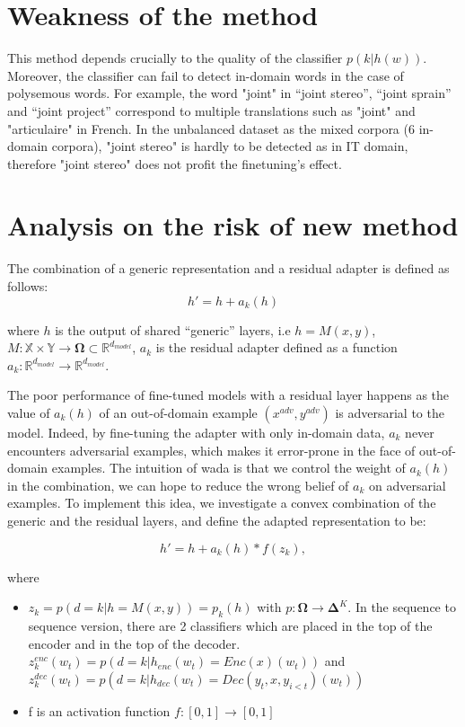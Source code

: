\documentclass[12pt,a4paper,twoside]{report}
\theoremstyle{definition}
\newcommand{\fyTodo}[1]{\Todo[FY:]{\textcolor{orange}{#1}}}
\begin{document}
\section*{Weakness of the method}

This method depends crucially to the quality of the classifier $p(k|h(w))$. Moreover, the classifier can fail to detect in-domain words in the case of polysemous words. For example, the word "joint" in ``joint stereo'', ``joint sprain'' and ``joint project'' correspond to multiple translations such as "joint" and "articulaire" in French. In the unbalanced dataset as the mixed corpora (6 in-domain corpora),  "joint stereo" is hardly to be detected as in IT domain, therefore "joint stereo" does not profit the finetuning's effect.

\section*{Analysis on the risk of new method}

The combination of a generic representation and a residual adapter is defined as follows:
\begin{equation}
  h' = h + a_k(h) \label{eq:residual-adapter}
\end{equation}

where $h$ is the output of shared ``generic'' layers, i.e $h=M(x,y)$, $M: \mathbb{X} \times \mathbb{Y} \rightarrow \mathbf{\Omega}\subset \mathbb{R}^{d_{model}}$, $a_k$ is the residual adapter defined as a function $a_k: \mathbb{R}^{d_{model}} \rightarrow \mathbb{R}^{d_{model}}$.

The poor performance of fine-tuned models with a residual layer happens as the value of $a_k(h)$ of an out-of-domain example $(x^{adv}, y^{adv})$ is adversarial to the model. Indeed, by fine-tuning the adapter with only in-domain data, $a_k$ never encounters adversarial examples, which makes it error-prone in the face of out-of-domain examples. The intuition of wada is that we control the weight of $a_k(h)$ in the combination, we can hope to reduce the wrong belief of $a_k$ on adversarial examples. To implement this idea, we  investigate a convex combination of the generic and the residual layers, and define the adapted representation to be:

\begin{equation}
h' = h + a_k(h) * f(z_k), 
\label{eq:2}
\end{equation}

\noindent{}where
\begin{itemize}
\item $z_k = p(d=k | h=M(x,y)) = p_k(h)$ with $p: \mathbf{\Omega} \rightarrow \mathbf{\Delta}^{K}$. In the sequence to sequence version, there are 2 classifiers which are placed in the top of the encoder and in the top of the decoder.
$z^{enc}_k(w_t) = p(d=k| h_{enc}(w_t)=Enc(x)(w_t))$ and $z^{dec}_k(w_t) = p(d=k| h_{dec}(w_t)=Dec(y_t,x,y_{i<t})(w_t))$
\fyTodo{Attention à $x$ et $y$}
\item f is an activation function $f: [0,1] \rightarrow [0,1]$ 
\end{itemize}
\end{document}
